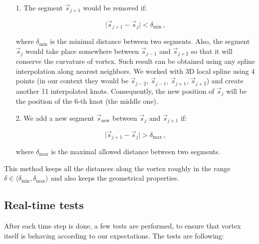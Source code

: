 \begin{itemize}
	\item[1.] The segment $\vec{s}_{j+1}$ would be removed if:

	\begin{equation}
	\vert \vec{s}_{j+1} - \vec{s}_j \vert < \delta_{\text{min}}\,,
	\end{equation}

	where $\delta_{\text{min}}$ is the minimal distance between two segments. Also, the segment $\vec{s}_j$ would take place somewhere between $\vec{s}_{j-1}$ and $\vec{s}_{j+2}$ so that it will conserve the curvature of vortex. Such result can be obtained using any spline interpolation along nearest neighbors. We worked with 3D local spline using 4 points (in our context they would be $\vec{s}_{j-2}$, $\vec{s}_{j-1}$, $\vec{s}_{j+1}$, $\vec{s}_{j+2}$) and create another 11 interpolated knots.
	Consequently, the new position of $\vec{s}_j$ will be the position of the 6-th knot (the middle one).

	\item[2.] We add a new segment $\vec{s}_{\text{new}}$ between $\vec{s}_{j}$ and $\vec{s}_{j+1}$ if:

	\begin{equation}
	\vert \vec{s}_{j+1} - \vec{s}_j \vert > \delta_{\text{max}}\,,
	\end{equation}

	where $\delta_{\text{max}}$ is the maximal allowed distance between two segments.
\end{itemize}

This method keeps all the distances along the vortex roughly in the range $\delta \in \langle \delta_{\text{min}}, \delta_{\text{max}} \rangle$ and also keeps the geometrical properties.

\subsection*{Real-time tests}

After each time step is done, a few tests are performed, to ensure that vortex itself is behaving according to our expectations. The tests are following:

